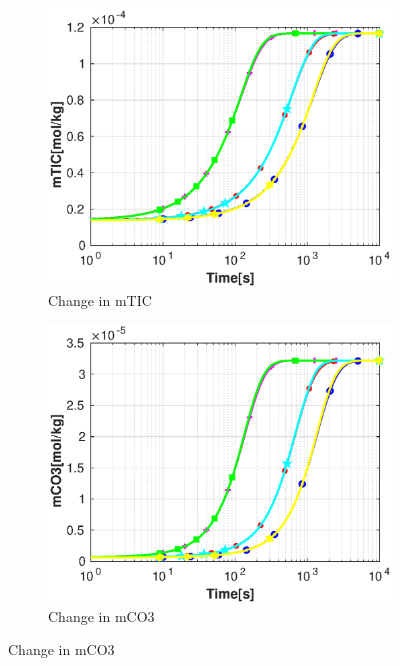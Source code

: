 \begin{figure}
    \hfill
    \begin{subfigure}{.5\linewidth}
            \centering
        \includegraphics[width=\textwidth]{PICTURES/dvm_pH9_mTIC.eps}
        \caption{\small Change in mTIC}
        \label{fig:dvmpH9mTIC}
    \end{subfigure}%
    \hfill
    \begin{subfigure}{.5\linewidth}
            \centering
        \includegraphics[width=\textwidth]{PICTURES/dvm_pH9_mCO3.eps}
        \caption{\small Change in mCO3}
        \label{fig:dvmpH9mCO3}
    \end{subfigure}%

\end{figure}
